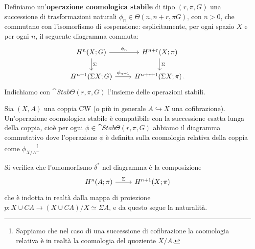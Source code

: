 	\begin{df}
		Definiamo un'\textbf{operazione coomologica stabile} di tipo
		$(r,\pi,G)$ una successione di trasformazioni naturali 
		$\phi_{n} \in \Theta(n,n+r, \pi G)$, con $n > 0$, che
		commutano con l'isomorfismo di sospensione:
		esplicitamente, per ogni spazio $X$ e per ogni $n$,
		il seguente diagramma commuta:
		\begin{equation*}
			\begin{tikzcd}
				H^{n}(X;G) \ar[r, "\phi_{n}"] \ar[d, "\Sigma"]
				& H^{n+r}(X;\pi) \ar[d, "\Sigma"] \\
				H^{n+1}(\Sigma X;G) \ar[r, "\phi_{n+1}"] 
				& H^{n+r+1}(\Sigma X;\pi) \,. 
			\end{tikzcd}
		\end{equation*}
		Indichiamo con $\cat{Stab}\Theta(r,\pi,G)$ l'insieme delle
		operazioni stabili.
	\end{df}
	
	\begin{thm}
		Sia $(X,A)$ una coppia CW (o più in generale $A \hookrightarrow X$ una cofibrazione).
		Un'operazione coomologica stabile è compatibile con la successione esatta lunga della coppia,
		cioè per ogni $\phi \in \cat{Stab}\Theta(r,\pi,G)$ abbiamo
		il diagramma commutativo
		dove l'operazione $\phi$ è definita sulla coomologia relativa
		della coppia come $\phi_{X/A}$\footnote{Sappiamo che nel caso di una successione di cofibrazione la coomologia relativa è in realtà la coomologia del quoziente $X/A$.}
	\end{thm}
	
	\begin{oss}
		Si verifica che l'omomorfismo $\delta^{*}$ nel diagramma
		è la composizione
		\begin{equation*}
			\begin{tikzcd}
				H^{n}(A;\pi) \ar[r, "\Sigma"]
				& H^{n+1}(X;\pi)
			\end{tikzcd}
		\end{equation*}
		che è indotta in realtà dalla mappa di proiezione
			$p:X \cup CA \to (X \cup CA)/X \simeq \Sigma A$,
		e da questo segue la naturalità.
	\end{oss}
